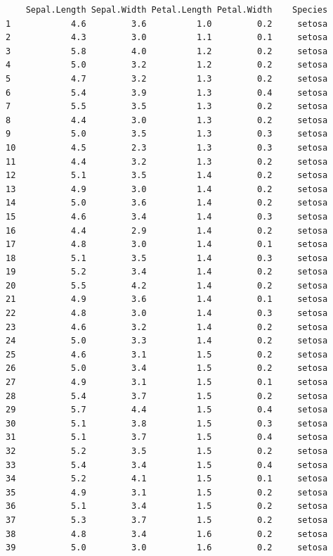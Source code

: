 \documentclass[
  letterpaper,
  DIV=11,
  numbers=noendperiod]{scrartcl}
\begin{document}
\begin{verbatim}
    Sepal.Length Sepal.Width Petal.Length Petal.Width    Species
1            4.6         3.6          1.0         0.2     setosa
2            4.3         3.0          1.1         0.1     setosa
3            5.8         4.0          1.2         0.2     setosa
4            5.0         3.2          1.2         0.2     setosa
5            4.7         3.2          1.3         0.2     setosa
6            5.4         3.9          1.3         0.4     setosa
7            5.5         3.5          1.3         0.2     setosa
8            4.4         3.0          1.3         0.2     setosa
9            5.0         3.5          1.3         0.3     setosa
10           4.5         2.3          1.3         0.3     setosa
11           4.4         3.2          1.3         0.2     setosa
12           5.1         3.5          1.4         0.2     setosa
13           4.9         3.0          1.4         0.2     setosa
14           5.0         3.6          1.4         0.2     setosa
15           4.6         3.4          1.4         0.3     setosa
16           4.4         2.9          1.4         0.2     setosa
17           4.8         3.0          1.4         0.1     setosa
18           5.1         3.5          1.4         0.3     setosa
19           5.2         3.4          1.4         0.2     setosa
20           5.5         4.2          1.4         0.2     setosa
21           4.9         3.6          1.4         0.1     setosa
22           4.8         3.0          1.4         0.3     setosa
23           4.6         3.2          1.4         0.2     setosa
24           5.0         3.3          1.4         0.2     setosa
25           4.6         3.1          1.5         0.2     setosa
26           5.0         3.4          1.5         0.2     setosa
27           4.9         3.1          1.5         0.1     setosa
28           5.4         3.7          1.5         0.2     setosa
29           5.7         4.4          1.5         0.4     setosa
30           5.1         3.8          1.5         0.3     setosa
31           5.1         3.7          1.5         0.4     setosa
32           5.2         3.5          1.5         0.2     setosa
33           5.4         3.4          1.5         0.4     setosa
34           5.2         4.1          1.5         0.1     setosa
35           4.9         3.1          1.5         0.2     setosa
36           5.1         3.4          1.5         0.2     setosa
37           5.3         3.7          1.5         0.2     setosa
38           4.8         3.4          1.6         0.2     setosa
39           5.0         3.0          1.6         0.2     setosa

\end{verbatim}
\end{document}
